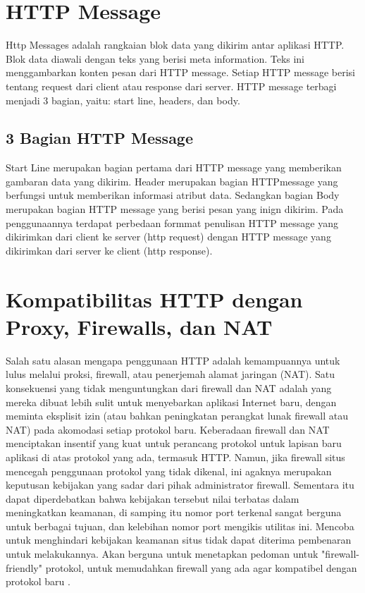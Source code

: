 \section{HTTP Message}
Http Messages adalah rangkaian blok data yang dikirim antar aplikasi HTTP. Blok data diawali dengan teks yang berisi meta information. Teks ini menggambarkan konten pesan dari HTTP message. Setiap HTTP message berisi tentang request dari client atau response dari server. HTTP message terbagi menjadi 3 bagian, yaitu: start line, headers, dan body\cite{hartono2013desain}.

\subsection{3 Bagian HTTP Message}
Start Line merupakan bagian pertama dari HTTP message yang memberikan gambaran data yang dikirim. Header merupakan bagian HTTPmessage yang berfungsi untuk memberikan informasi atribut data. Sedangkan bagian Body merupakan bagian HTTP message yang berisi pesan yang inign dikirim. Pada penggunaannya terdapat perbedaan formmat penulisan HTTP message yang dikirimkan dari client ke server (http request) dengan HTTP message yang dikirimkan dari server ke client (http response)\cite{hartono2013desain}.

\section{Kompatibilitas HTTP dengan Proxy, Firewalls, dan NAT}
Salah satu alasan mengapa penggunaan HTTP adalah kemampuannya untuk lulus melalui proksi, firewall, atau penerjemah alamat jaringan (NAT). Satu konsekuensi yang tidak menguntungkan dari firewall dan NAT adalah yang mereka dibuat lebih sulit untuk menyebarkan aplikasi Internet baru, dengan meminta eksplisit izin (atau bahkan peningkatan perangkat lunak firewall atau NAT) pada akomodasi setiap protokol baru. Keberadaan firewall dan NAT menciptakan insentif yang kuat untuk perancang protokol untuk lapisan baru aplikasi di atas protokol yang ada, termasuk HTTP. Namun, jika firewall situs mencegah penggunaan protokol yang tidak dikenal, ini agaknya merupakan keputusan kebijakan yang sadar dari pihak administrator firewall. Sementara itu dapat diperdebatkan bahwa kebijakan tersebut nilai terbatas dalam meningkatkan keamanan, di samping itu nomor port terkenal sangat berguna untuk berbagai tujuan, dan kelebihan nomor port mengikis utilitas ini. Mencoba untuk menghindari kebijakan keamanan situs tidak dapat diterima pembenaran untuk melakukannya. Akan berguna untuk menetapkan pedoman untuk "firewall-friendly" protokol, untuk memudahkan firewall yang ada agar kompatibel dengan protokol baru
\cite{moore2002use}.

